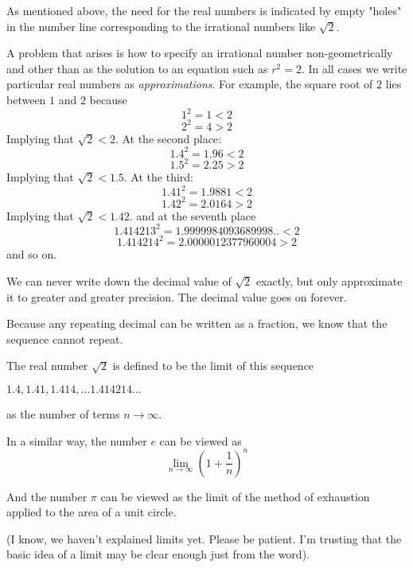 \documentclass[11pt, oneside]{article}
\begin{document}
As mentioned above, the need for the real numbers is indicated by empty "holes" in the number line corresponding to the irrational numbers like $\sqrt{2}$.

A problem that arises is how to specify an irrational number non-geometrically and other than as the solution to an equation such as $r^2 = 2$.  In all cases we write particular real numbers as \emph{approximations}.  For example, the square root of $2$ lies between $1$ and $2$ because
\[ 1^2 = 1 < 2 \]
\[ 2^2 = 4 > 2 \]
Implying that $\sqrt{2} < 2$.  At the second place:
\[ 1.4^2 = 1.96 < 2 \] 
\[1.5^2 = 2.25 > 2 \]
Implying that $\sqrt{2} < 1.5$.  At the third:
\[ 1.41^2 = 1.9881 < 2 \]
\[1.42^2 = 2.0164 > 2 \]
Implying that $\sqrt{2} < 1.42$.  and at the seventh place
\[ 1.414213^2 = 1.9999984093689998.. < 2 \]
\[ 1.414214^2 = 2.0000012377960004 > 2 \]
and so on.

We can never write down the decimal value of $\sqrt{2}$ exactly, but only approximate it to greater and greater precision.  The decimal value goes on forever.  

Because any repeating decimal can be written as a fraction, we know that the sequence cannot repeat.

The real number $\sqrt{2}$ is defined to be the limit of this sequence 

$1.4, 1.41, 1.414, \dots 1.414214 \dots$ 

as the number of terms $n \rightarrow \infty$.

In a similar way, the number $e$ can be viewed as
\[ \lim_{n \rightarrow \infty} (1 + \frac{1}{n})^n \]

And the number $\pi$ can be viewed as the limit of the method of exhaustion applied to the area of a unit circle.

(I know, we haven't explained limits yet.  Please be patient.  I'm trusting that the basic idea of a limit may be clear enough just from the word).
\end{document}
